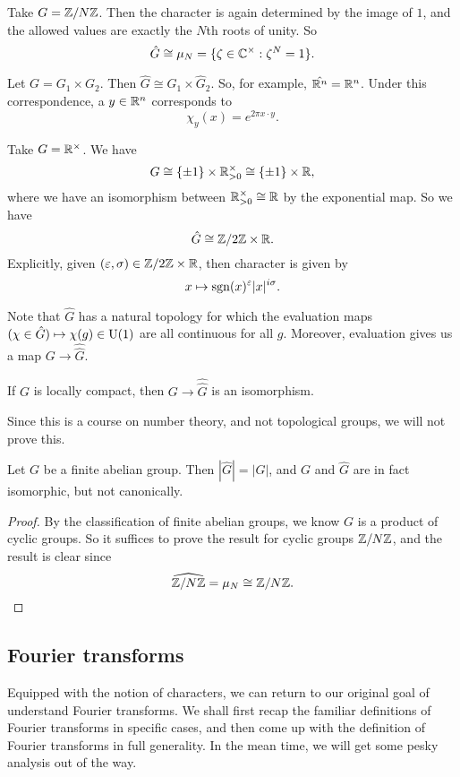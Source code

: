 \documentclass[a4paper]{article}
\begin{document}
\begin{eg}
  Take $G = \mathbb{Z}/N\mathbb{Z}$. Then the character is again determined by the image of $1$, and the allowed values are exactly the $N$th roots of unity. So
  \[
    \hat{G} \cong \mu_N = \{\zeta \in \mathbb{C}^\times: \zeta^N = 1\}.
  \]
\end{eg}

\begin{eg}
  Let $G = G_1 \times G_2$. Then $\hat{G} \cong \hat{G}_1 \times \hat{G}_2$. So, for example, $\hat{\mathbb{R}^n} = \mathbb{R}^n$. Under this correspondence, a $y \in \mathbb{R}^n$ corresponds to
  \[
    \chi_y(x) = e^{2\pi x\cdot y}.
  \]
\end{eg}

\begin{eg}
  Take $G = \mathbb{R}^\times$. We have
  \[
    G \cong \{\pm 1\} \times \mathbb{R}^\times_{>0} \cong \{\pm 1\} \times \mathbb{R},
  \]
  where we have an isomorphism between $\mathbb{R}^{\times}_{> 0} \cong \mathbb{R}$ by the exponential map. So we have
  \[
    \hat{G} \cong \mathbb{Z}/2\mathbb{Z} \times \mathbb{R}.
  \]
  Explicitly, given $(\varepsilon, \sigma) \in \mathbb{Z}/2\mathbb{Z} \times \mathbb{R}$, then character is given by
  \[
    x \mapsto \operatorname{sgn}(x)^\varepsilon |x|^{i\sigma}.
  \]
\end{eg}

Note that $\hat{G}$ has a natural topology for which the evaluation maps $(\chi \in \hat{G}) \mapsto \chi(g) \in \mathrm{U}(1)$ are all continuous for all $g$. Moreover, evaluation gives us a map $G \to \hat{\hat{G}}$.

\begin{thm}
  If $G$ is locally compact, then $G \to \hat{\hat{G}}$ is an isomorphism.
\end{thm}
Since this is a course on number theory, and not topological groups, we will not prove this.

\begin{prop}
  Let $G$ be a finite abelian group. Then $|\hat{G}| = |G|$, and $G$ and $\hat{G}$ are in fact isomorphic, but not canonically.
\end{prop}

\begin{proof}
  By the classification of finite abelian groups, we know $G$ is a product of cyclic groups. So it suffices to prove the result for cyclic groups $\mathbb{Z}/N\mathbb{Z}$, and the result is clear since
  \[
    \widehat{\mathbb{Z}/N\mathbb{Z}} = \mu_N \cong \mathbb{Z}/N\mathbb{Z}.\qedhere
  \]
\end{proof}

\subsection{Fourier transforms}
Equipped with the notion of characters, we can return to our original goal of understand Fourier transforms. We shall first recap the familiar definitions of Fourier transforms in specific cases, and then come up with the definition of Fourier transforms in full generality. In the mean time, we will get some pesky analysis out of the way.
\end{document}
